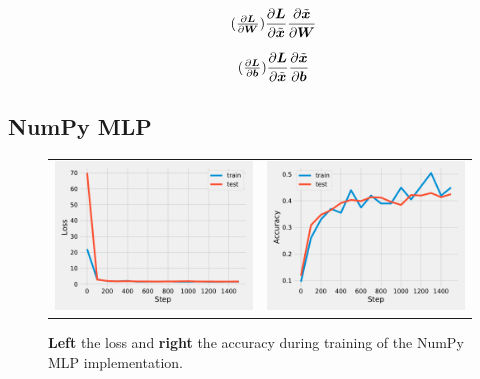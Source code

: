 \documentclass{article}
\newcommand\·{\ensuremath{\cdot}}
\newcommand\…{\ensuremath{\ldots}}
\newcommand\pf[2]{\ensuremath{\frac{\partial {#1}}{\partial {#2}}}}
\newcommand*{\B}[1]{\ifmmode\bm{#1}\else\textbf{#1}\fi}
\newcommand\1{\ensuremath{\mathds{1}}}
\begin{document}
\begin{align*}
  \tag{$\pf{\B{L}}{\B{W}}$}
  \pf{\B{L}}{\tilde{\B{x}}}\pf{\tilde{\B{x}}}{\B{W}}\\
\end{align*}

\begin{align*}
  \tag{$\pf{\B{L}}{\B{b}}$}
  \pf{\B{L}}{\tilde{\B{x}}}\pf{\tilde{\B{x}}}{\B{b}}
\end{align*}

\subsection{NumPy MLP}
\begin{figure}
  \begin{tabularx}{\linewidth}{XX}
    \includegraphics[width=\linewidth]{assignment_1/code/np_loss.pdf} &
    \includegraphics[width=\linewidth]{assignment_1/code/np_accuracy.pdf}
  \end{tabularx}
  \caption{\textbf{Left} the loss and \textbf{right} the accuracy during training of the NumPy MLP implementation.}
  \label{fig:numpy}
\end{figure}
\end{document}
